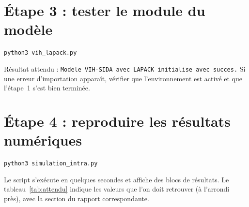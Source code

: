 \documentclass[11pt,a4paper]{report}
\theoremstyle{plain}
\theoremstyle{definition}
\theoremstyle{remark}
\begin{document}
\section{Étape 3 : tester le module du modèle}

\begin{lstlisting}[language={}]
python3 vih_lapack.py
\end{lstlisting}

\noindent Résultat attendu : \texttt{Modele VIH-SIDA avec LAPACK initialise avec succes.} Si une erreur d'importation apparaît, vérifier que l'environnement est activé et que l'étape~1 s'est bien terminée.

\section{Étape 4 : reproduire les résultats numériques}

\begin{lstlisting}[language={}]
python3 simulation_intra.py
\end{lstlisting}

\noindent Le script s'exécute en quelques secondes et affiche des blocs de résultats. Le tableau~\ref{tab:attendu} indique les valeurs que l'on doit retrouver (à l'arrondi près), avec la section du rapport correspondante.
\end{document}
